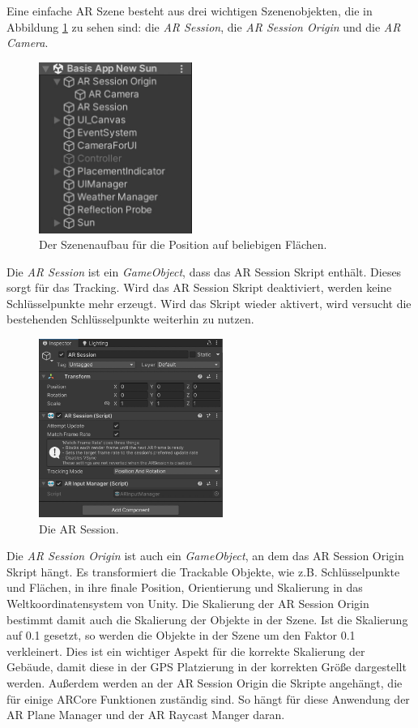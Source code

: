 Eine einfache AR Szene besteht aus drei wichtigen Szenenobjekten, die in Abbildung \ref*{fig:anwendung-umsetzung-szenenaufbau} zu sehen sind: die \textit{AR Session}, die \textit{AR Session Origin} und die \textit{AR Camera}.

\begin{figure}[H]
    \centering
    \includegraphics[width=5cm]{img/anwendung/technisch/ar-setup/setup-szenenaufbau.jpg}
    \caption{Der Szenenaufbau für die Position auf beliebigen Flächen.}
    \label{fig:anwendung-umsetzung-szenenaufbau}
\end{figure}

Die \textit{AR Session} ist ein \textit{GameObject}, dass das AR Session Skript enthält. Dieses sorgt für das Tracking. Wird das AR Session Skript deaktiviert, werden keine Schlüsselpunkte mehr erzeugt. Wird das Skript wieder aktivert, wird versucht die bestehenden Schlüsselpunkte weiterhin zu nutzen.

\begin{figure}[H]
    \centering
    \includegraphics[width=6cm]{img/anwendung/technisch/ar-setup/setup-arsession.jpg}
    \caption{Die AR Session.}
    \label{fig:anwendung-umsetzung-arsession}
\end{figure}

Die \textit{AR Session Origin} ist auch ein \textit{GameObject}, an dem das AR Session Origin Skript hängt. Es transformiert die Trackable Objekte, wie z.B.  Schlüsselpunkte und Flächen, in ihre finale Position, Orientierung und Skalierung in das Weltkoordinatensystem von Unity. Die Skalierung der AR Session Origin bestimmt damit auch die Skalierung der Objekte in der Szene. Ist die Skalierung auf 0.1 gesetzt, so werden die Objekte in der Szene um den Faktor 0.1 verkleinert. Dies ist ein wichtiger Aspekt für die korrekte Skalierung der Gebäude, damit diese in der GPS Platzierung in der korrekten Größe dargestellt werden. Außerdem werden an der AR Session Origin die Skripte angehängt, die für einige ARCore Funktionen zuständig sind. So hängt für diese Anwendung der AR Plane Manager und der AR Raycast Manger daran.

